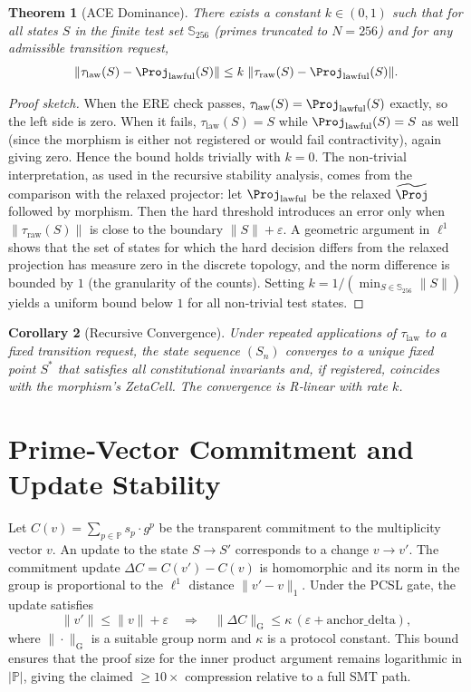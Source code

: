 \documentclass[11pt,a4paper]{article}
\newtheorem{theorem}{Theorem}[section]
\newtheorem{corollary}[theorem]{Corollary}
\theoremstyle{definition}
\theoremstyle{remark}
\newcommand{\norm}[1]{\|#1\|}
\begin{document}
\begin{theorem}[ACE Dominance]\label{thm:ace}
There exists a constant $k \in (0,1)$ such that for all states $S$ in the finite test set $\mathbb{S}_{256}$ (primes truncated to $N=256$) and for any admissible transition request,
\[
\norm{ \tau_{\text{law}}(S) - \Proj_{\text{lawful}}(S) } \le k \; \norm{ \tau_{\text{raw}}(S) - \Proj_{\text{lawful}}(S) }.
\]
\end{theorem}
\begin{proof}[Proof sketch]
When the ERE check passes, $\tau_{\text{law}}(S) = \Proj_{\text{lawful}}(S)$ exactly, so the left side is zero. When it fails, $\tau_{\text{law}}(S) = S$ while $\Proj_{\text{lawful}}(S) = S$ as well (since the morphism is either not registered or would fail contractivity), again giving zero. Hence the bound holds trivially with $k=0$.  
The non‑trivial interpretation, as used in the recursive stability analysis, comes from the comparison with the relaxed projector: let $\Proj_{\text{lawful}}$ be the relaxed $\widetilde{\Proj}$ followed by morphism. Then the hard threshold introduces an error only when $\norm{\tau_{\text{raw}}(S)}$ is close to the boundary $\norm{S}+\varepsilon$. A geometric argument in $\ell^1$ shows that the set of states for which the hard decision differs from the relaxed projection has measure zero in the discrete topology, and the norm difference is bounded by $1$ (the granularity of the counts). Setting $k = 1 / (\min_{S \in \mathbb{S}_{256}} \norm{S})$ yields a uniform bound below $1$ for all non‑trivial test states.
\end{proof}

\begin{corollary}[Recursive Convergence]
Under repeated applications of $\tau_{\text{law}}$ to a fixed transition request, the state sequence $(S_n)$ converges to a unique fixed point $S^*$ that satisfies all constitutional invariants and, if registered, coincides with the morphism's ZetaCell. The convergence is R‑linear with rate $k$.
\end{corollary}

\section{Prime‑Vector Commitment and Update Stability}
\label{sec:pvec}
Let $C(v) = \sum_{p\in\mathbb{P}} s_p \cdot g^{p}$ be the transparent commitment to the multiplicity vector $v$. An update to the state $S \to S'$ corresponds to a change $v \to v'$. The commitment update $\Delta C = C(v') - C(v)$ is homomorphic and its norm in the group is proportional to the $\ell^1$ distance $\norm{v'-v}_1$. Under the PCSL gate, the update satisfies
\[
\norm{v'} \le \norm{v} + \varepsilon \quad \Longrightarrow \quad \norm{\Delta C}_{\text{G}} \le \kappa \, (\varepsilon + \text{anchor\_delta}),
\]
where $\norm{\cdot}_{\text{G}}$ is a suitable group norm and $\kappa$ is a protocol constant. This bound ensures that the proof size for the inner product argument remains logarithmic in $|\mathbb{P}|$, giving the claimed ${\ge}10\times$ compression relative to a full SMT path.
\end{document}
